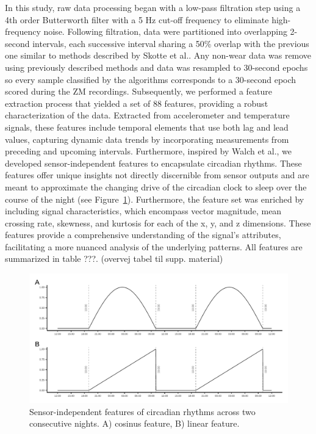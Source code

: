 \documentclass[
  super,
  preprint,
  3p]{elsarticle}
\begin{document}
In this study, raw data processing began with a low-pass filtration step
using a 4th order Butterworth filter with a 5 Hz cut-off frequency to
eliminate high-frequency noise. Following filtration, data were
partitioned into overlapping 2-second intervals, each successive
interval sharing a 50\% overlap with the previous one similar to methods
described by Skotte et al.\citep{skotte_detection_2014}. Any non-wear
data was remove using previously described methods\citep{skovgaard2023}
and data was resampled to 30-second epochs so every sample classified by
the algorithms corresponds to a 30-second epoch scored during the ZM
recordings. Subsequently, we performed a feature extraction process that
yielded a set of 88 features, providing a robust characterization of the
data. Extracted from accelerometer and temperature signals, these
features include temporal elements that use both lag and lead values,
capturing dynamic data trends by incorporating measurements from
preceding and upcoming intervals. Furthermore, inspired by Walch et
al.\citep{walch2019}, we developed sensor-independent features to
encapsulate circadian rhythms. These features offer unique insights not
directly discernible from sensor outputs and are meant to approximate
the changing drive of the circadian clock to sleep over the course of
the night (see Figure~\ref{fig-sensor-independent}). Furthermore, the
feature set was enriched by including signal characteristics, which
encompass vector magnitude, mean crossing rate, skewness, and kurtosis
for each of the x, y, and z dimensions. These features provide a
comprehensive understanding of the signal's attributes, facilitating a
more nuanced analysis of the underlying patterns. All features are
summarized in table ???. (overvej tabel til supp. material)

\begin{figure}[b]

{\centering \includegraphics{visuals/sensor_independent.pdf}

}

\caption{\label{fig-sensor-independent}Sensor-independent features of
circadian rhythms across two consecutive nights. A) cosinus feature, B)
linear feature.}

\end{figure}
\end{document}
